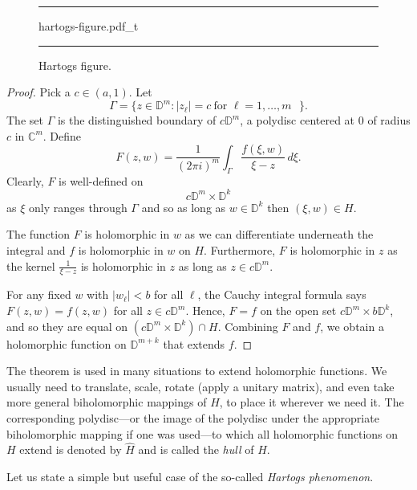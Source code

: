 \documentclass[12pt,openany]{book}
\newcommand{\sabs}[1]{\lvert {#1} \rvert}
\newcommand{\C}{{\mathbb{C}}}
\newcommand{\D}{{\mathbb{D}}}
\newcommand{\myindex}[1]{#1\index{#1}}
\theoremstyle{plain}
\theoremstyle{remark}
\theoremstyle{definition}
\newenvironment{myfig}{%
\begin{figure}[h!t]
\noindent\rule{\textwidth}{0.5pt}\vspace{12pt}\par\centering}%
{\par\noindent\rule{\textwidth}{0.5pt}
\end{figure}}
\theoremstyle{exercise}
\theoremstyle{example}
\begin{document}
\begin{myfig}
\newcommand{\hartogstext}{\parbox[t]{2.3in}{In diagrams, the Hartogs figure is
often drawn as:}}
{hartogs-figure.pdf_t}
\caption{Hartogs figure.\label{fig:hartogs-figure}}
\end{myfig}

\begin{proof}
Pick a $c \in (a,1)$.  Let
\begin{equation*}
\Gamma =
\bigl\{ z \in \D^{m} : \sabs{z_\ell} = c ~\text{for $\ell=1,\ldots,m$ } \bigr\}.
\end{equation*}
The set $\Gamma$ is the distinguished boundary of $c \D^m$,
a polydisc centered at $0$ of radius $c$ in $\C^m$.
Define
\begin{equation*}
F(z,w)
=
\frac{1}{{(2\pi i)}^m}
\int_\Gamma \frac{f(\xi,w)}{\xi-z} \, d\xi .
\end{equation*}
Clearly, $F$ is well-defined on
\begin{equation*}
c\D^m \times \D^k
\end{equation*}
as $\xi$ only
ranges through $\Gamma$ and so as long as $w \in \D^k$ then $(\xi,w) \in H$.

The function $F$ is holomorphic in $w$ as we can differentiate
underneath the integral and $f$ is holomorphic in $w$ on $H$.  Furthermore,
$F$ is holomorphic in $z$ as the kernel $\frac{1}{\xi-z}$ is holomorphic in
$z$ as long as $z \in c\D^m$.

For any fixed $w$ with $\sabs{w_\ell} < b$ for all $\ell$,
the Cauchy integral formula says
$F(z,w) = f(z,w)$ for all $z \in c \D^m$.
Hence, $F=f$ on the open set
$c\D^m \times b\D^k$,
and so they are equal on
$(c\D^m \times \D^k) \cap H$.
Combining $F$ and $f$, we obtain a holomorphic
function on $\D^{m+k}$ that extends $f$.
\end{proof}

The theorem is used in many situations to extend holomorphic functions.
We usually need to translate, scale, rotate (apply a unitary matrix),
and even take more general biholomorphic mappings
of $H$, to place it wherever we need it.
The corresponding polydisc---or the image of
the polydisc under the appropriate biholomorphic mapping if one was
used---to which all holomorphic functions on $H$ extend is denoted
by $\widehat{H}$ and is called the \emph{hull} of $H$.%

Let us state a simple but useful case of the so-called
\emph{\myindex{Hartogs phenomenon}}.
\end{document}
